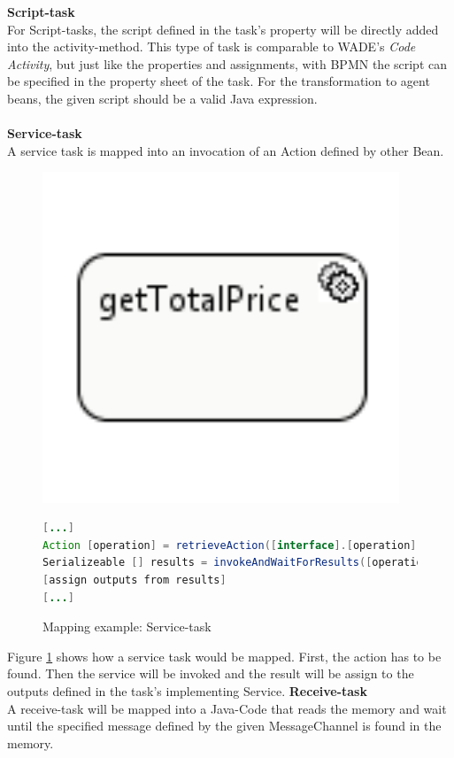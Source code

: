 \textbf{Script-task}\\
For Script-tasks, the script defined in the task's property will be directly added into the activity-method. This type of task is comparable to WADE's \textit{Code Activity}, but just like the properties and assignments, with BPMN the script can be specified in the property sheet of the task. For the transformation to agent beans, the given script should be a valid Java expression. \\\\

\textbf{Service-task}\\
A service task is mapped into an invocation of an Action defined by other Bean.
\begin{figure}[h]
\begin{minipage}[c]{0.3\textwidth}
\includegraphics[width=0.95\textwidth]{images/mapping/service_task.png}
\end{minipage}
\begin{minipage}[c]{0.7\textwidth}
\begin{lstlisting}[language=Java]
[...]
Action [operation] = retrieveAction([interface].[operation]);
Serializeable [] results = invokeAndWaitForResults([operation], new Serializeable[]{[inputs]}).getResults();
[assign outputs from results]
[...]
\end{lstlisting}
\end{minipage}
\caption{Mapping example: Service-task}%
\label{fig:service_task}%
\end{figure}
Figure \ref{fig:service_task} shows how a service task would be mapped. First, the action has to be found. Then the service will be invoked and the result will be assign to the outputs defined in the task's implementing Service.
\newpage
\textbf{Receive-task}\\
A receive-task will be mapped into a Java-Code that reads the memory and wait until the specified message defined by the given MessageChannel is found in the memory. \\


